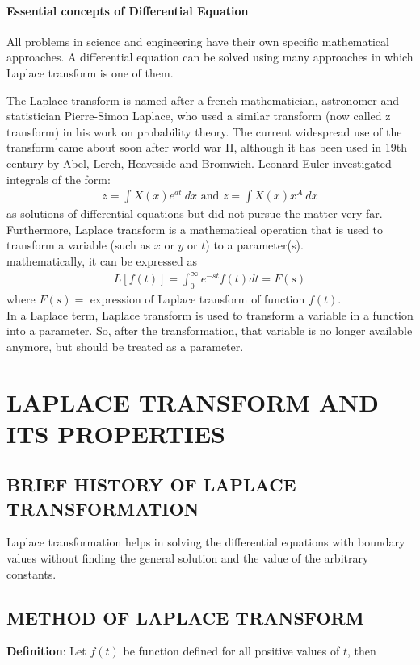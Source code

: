\documentclass[12pt]{report}
\begin{document}
\subsubsection{Essential concepts of Differential Equation}
\qquad All problems in science and engineering have their own specific mathematical approaches. A differential equation can be solved using many approaches in which Laplace transform is one of them. \\
\par The Laplace transform is named after a french mathematician, astronomer and statistician Pierre-Simon Laplace, who used a similar transform (now called z transform) in his work on probability theory. The current widespread use of the transform came about soon after world war II, although it has been used in 19th century by Abel, Lerch, Heaveside and Bromwich. Leonard Euler investigated integrals of the form:
\begin{align*}
z=\int X(x)e^{at}~dx \mbox{ and } z=\int X(x)x^A~dx
\end{align*}
as solutions of differential equations but did not pursue the matter very far. Furthermore, Laplace transform is a mathematical operation that is used to transform a variable (such as $x \mbox{ or } y \mbox{ or } t$) to a parameter(s). \\
mathematically, it can be expressed as
\begin{align*}
L[f(t)]=\int_0^\infty e^{-st} f(t)dt=F(s)
\end{align*}
where $F(s)=$ expression of Laplace transform of function $f(t)$. \\
In a Laplace term, Laplace transform is used to transform a variable in a function into a parameter. So, after the transformation, that variable is no longer available anymore, but should be treated as a parameter.
\chapter{LAPLACE TRANSFORM AND ITS PROPERTIES}
\section{BRIEF HISTORY OF LAPLACE TRANSFORMATION}
Laplace transformation helps in solving the differential equations with boundary values without finding the general solution and the value of the arbitrary constants.
\section{METHOD OF LAPLACE TRANSFORM}
\textbf{Definition}: Let $f(t)$ be function defined for all positive values of $t$, then
\end{document}
